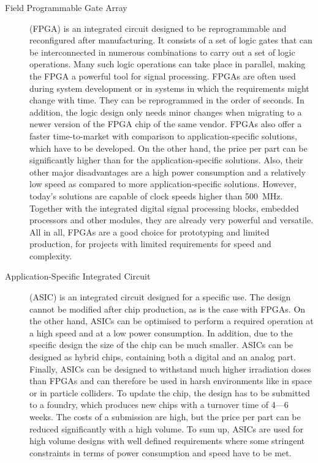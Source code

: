 \begin{description}
\item[Field Programmable Gate Array] (FPGA) is an integrated circuit designed to be reprogrammable and reconfigured after manufacturing. It consists of a set of logic gates that can be interconnected in numerous combinations to carry out a set of logic operations. Many such logic operations can take place in parallel, making the FPGA a powerful tool for signal processing. FPGAs are often used during system development or in systems in which the requirements might change with time. They can be reprogrammed in the order of seconds. In addition, the logic design only needs minor changes when migrating to a newer version of the FPGA chip of the same vendor. FPGAs also offer a faster time-to-market with comparison to application-specific solutions, which have to be developed. On the other hand, the price per part can be significantly higher than for the application-specific solutions. Also, their other major disadvantages are a high power consumption and a relatively low speed as compared to more application-specific solutions. However, today's solutions are capable of clock speeds higher than 500~MHz. Together with the integrated digital signal processing blocks, embedded processors and other modules, they are already very powerful and versatile. All in all, FPGAs are a good choice for prototyping and limited production, for projects with limited requirements for speed and complexity.

\item[Application-Specific Integrated Circuit] (ASIC) is an integrated circuit designed for a specific use. The design cannot be modified after chip production, as is the case with FPGAs. On the other hand, ASICs can be optimised to perform a required operation at a high speed and at a low power consumption. In addition, due to the specific design the size of the chip can be much smaller. ASICs can be designed as hybrid chips, containing both a digital and an analog part. Finally, ASICs can be designed to withstand much higher irradiation doses than FPGAs and can therefore be used in harsh environments like in space or in particle colliders. To update the chip, the design has to be submitted to a foundry, which produces new chips with a turnover time of 4---6 weeks. The costs of a submission are high, but the price per part can be reduced significantly with a high volume. To sum up, ASICs are used for high volume designs with well defined requirements where some stringent constraints in terms of power consumption and speed have to be met.
\end{description} 

